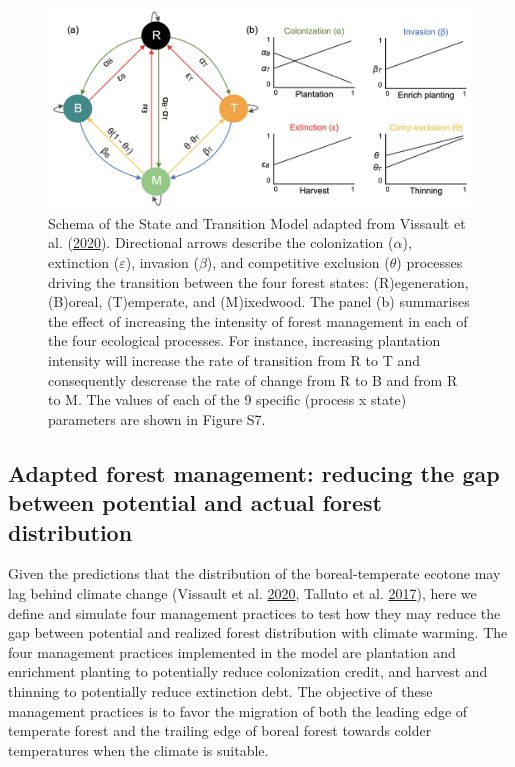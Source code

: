 \documentclass[12pt]{article}
\begin{document}
\begin{figure}
\hypertarget{fig:model}{%
\centering
\includegraphics[width=1\textwidth,height=\textheight]{manuscript/img/model_equation_fm.png}
\caption{Schema of the State and Transition Model adapted from Vissault
et al. (\protect\hyperlink{ref-Vissault2020}{2020}). Directional arrows
describe the colonization (\(\alpha\)), extinction (\(\varepsilon\)),
invasion (\(\beta\)), and competitive exclusion (\(\theta\)) processes
driving the transition between the four forest states: (R)egeneration,
(B)oreal, (T)emperate, and (M)ixedwood. The panel (b) summarises the
effect of increasing the intensity of forest management in each of the
four ecological processes. For instance, increasing plantation intensity
will increase the rate of transition from R to T and consequently
descrease the rate of change from R to B and from R to M. The values of
each of the 9 specific (process x state) parameters are shown in Figure
S7.}\label{fig:model}
}
\end{figure}

\hypertarget{adapted-forest-management-reducing-the-gap-between-potential-and-actual-forest-distribution}{%
\subsection{Adapted forest management: reducing the gap between
potential and actual forest
distribution}\label{adapted-forest-management-reducing-the-gap-between-potential-and-actual-forest-distribution}}

Given the predictions that the distribution of the boreal-temperate
ecotone may lag behind climate change (Vissault et al.
\protect\hyperlink{ref-Vissault2020}{2020}, Talluto et al.
\protect\hyperlink{ref-Talluto2017}{2017}), here we define and simulate
four management practices to test how they may reduce the gap between
potential and realized forest distribution with climate warming. The
four management practices implemented in the model are plantation and
enrichment planting to potentially reduce colonization credit, and
harvest and thinning to potentially reduce extinction debt. The
objective of these management practices is to favor the migration of
both the leading edge of temperate forest and the trailing edge of
boreal forest towards colder temperatures when the climate is suitable.
\end{document}

